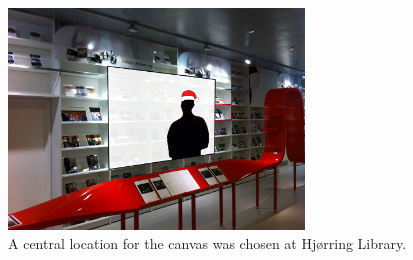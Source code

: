 



\begin{figure}[htbp]
\centering
\includegraphics[width=0.7\textwidth]{Pictures/HjoerringLibrary/LocationJohannesHat.jpg}
\caption{A central location for the canvas was chosen at Hj{\o}rring Library.}
\label{fig:concept_art}
\end{figure}


